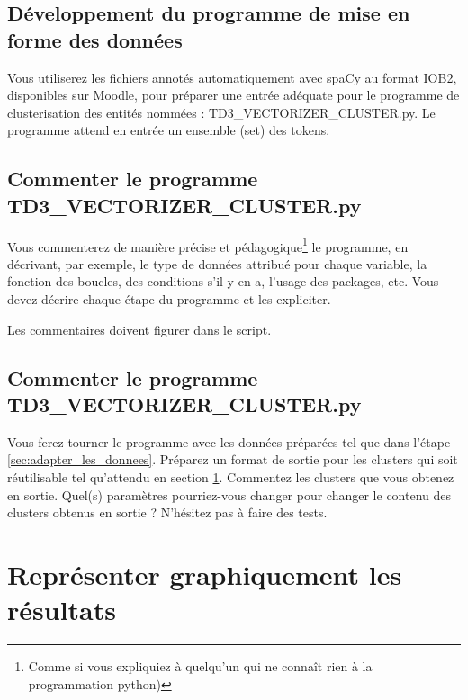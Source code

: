 \vspace{0.5cm}
\subsection{Développement du programme de mise en forme des données}
\vspace{0.5cm}
\label{sec:adapter_les_donnees}
Vous utiliserez les fichiers annotés automatiquement avec spaCy au format IOB2, disponibles sur Moodle, pour préparer une entrée adéquate pour le programme de clusterisation des entités nommées : TD3\_VECTORIZER\_CLUSTER.py. Le programme attend en entrée un ensemble (set) des tokens.


\subsection{Commenter le programme TD3\_VECTORIZER\_CLUSTER.py}

Vous commenterez de manière précise et pédagogique\footnote{Comme si vous expliquiez à quelqu'un qui ne connaît rien à la programmation python)} le programme, en décrivant, par exemple, le type de données attribué pour chaque variable, la fonction des boucles, des conditions s'il y en a, l'usage des packages, etc.
\newline
Vous devez décrire chaque étape du programme et les expliciter.
\newline

Les commentaires doivent figurer dans le script.

\subsection{Commenter le programme TD3\_VECTORIZER\_CLUSTER.py}

Vous ferez tourner le programme avec les données préparées tel que dans l'étape \ref{sec:adapter_les_donnees}.
\newline
Préparez un format de sortie pour les clusters qui soit réutilisable tel qu'attendu en section \ref{sec:representation_graphique}.
\newline
Commentez les clusters que vous obtenez en sortie. Quel(s) paramètres pourriez-vous changer pour changer le contenu des clusters obtenus en sortie ? N'hésitez pas à faire des tests.
 
\section{Représenter graphiquement les résultats}
 \label{sec:representation_graphique}
 
